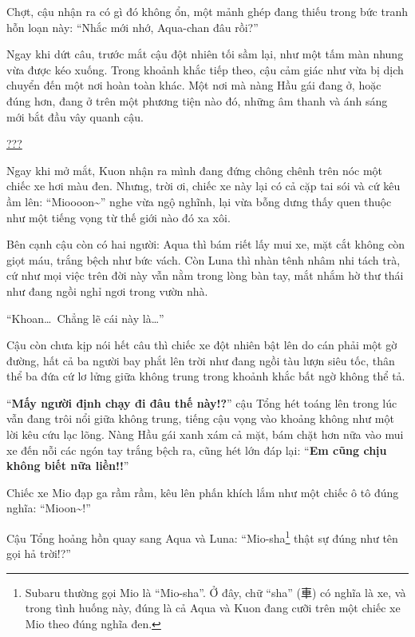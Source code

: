 \documentclass[../main.tex]{subfiles}
\begin{document}
Chợt, cậu nhận ra có gì đó không ổn, một mảnh ghép đang thiếu trong bức tranh hỗn loạn này: ``Nhắc mới nhớ, Aqua-chan đâu rồi?''

Ngay khi dứt câu, trước mắt cậu đột nhiên tối sầm lại, như một tấm màn nhung vừa được kéo xuống. Trong khoảnh khắc tiếp theo, cậu cảm giác như vừa bị dịch chuyển đến một nơi hoàn toàn khác. Một nơi mà nàng Hầu gái đang ở, hoặc đúng hơn, đang ở trên một phương tiện nào đó, những âm thanh và ánh sáng mới bắt đầu vây quanh cậu.

\ct

\begin{center}
  \uline{???}
\end{center}

Ngay khi mở mắt, Kuon nhận ra mình đang đứng chông chênh trên nóc một chiếc xe hơi màu đen. Nhưng, trời ơi, chiếc xe này lại có cả cặp tai sói và cứ kêu ầm lên: ``Mioooon\~{}'' nghe vừa ngộ nghĩnh, lại vừa bỗng dưng thấy quen thuộc như một tiếng vọng từ thế giới nào đó xa xôi.

Bên cạnh cậu còn có hai người: Aqua thì bám riết lấy mui xe, mặt cắt không còn giọt máu, trắng bệch như bức vách. Còn Luna thì nhàn tênh nhâm nhi tách trà, cứ như mọi việc trên đời này vẫn nằm trong lòng bàn tay, mắt nhắm hờ thư thái như đang ngồi nghỉ ngơi trong vườn nhà.


``Khoan\dots\ Chẳng lẽ cái này là\dots''

Cậu còn chưa kịp nói hết câu thì chiếc xe đột nhiên bật lên do cán phải một gờ đường, hất cả ba người bay phắt lên trời như đang ngồi tàu lượn siêu tốc, thân thể ba đứa cứ lơ lửng giữa không trung trong khoảnh khắc bất ngờ không thể tả.

``\textbf{Mấy người định chạy đi đâu thế này!?}'' cậu Tổng hét toáng lên trong lúc vẫn đang trôi nổi giữa không trung, tiếng cậu vọng vào khoảng không như một lời kêu cứu lạc lõng. Nàng Hầu gái xanh xám cả mặt, bám chặt hơn nữa vào mui xe đến nỗi các ngón tay trắng bệch ra, cũng hét lớn đáp lại: ``\textbf{Em cũng chịu không biết nữa liền!!}''

Chiếc xe Mio đạp ga rầm rầm, kêu lên phấn khích lắm như một chiếc ô tô đúng nghĩa: ``Mioon\~{}!''

Cậu Tổng hoảng hồn quay sang Aqua và Luna: ``Mio-sha\footnote{Subaru thường gọi Mio là ``Mio-sha''. Ở đây, chữ ``sha'' (車) có nghĩa là xe, và trong tình huống này, đúng là cả Aqua và Kuon đang cưỡi trên một chiếc xe Mio theo đúng nghĩa đen.} thật sự đúng như tên gọi hả trời!?''
\end{document}
